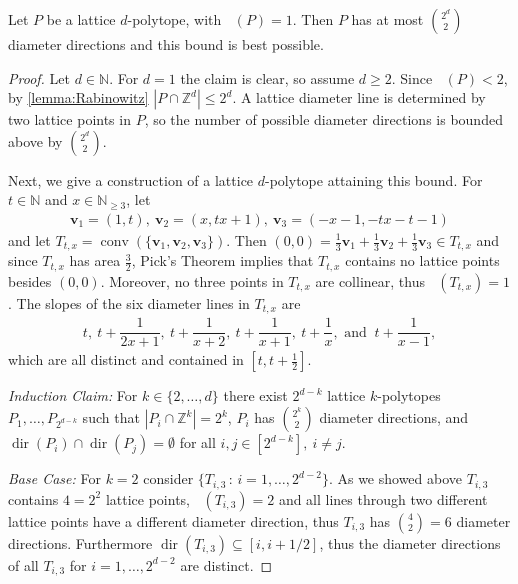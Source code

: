 \documentclass[11pt]{article}
\newcommand{\bv}{\mathbf{v}}
\newcommand{\Z}{\mathbb{Z}}
\newcommand{\N}{\mathbb{N}}
\DeclareMathOperator{\conv}{conv}
\DeclareMathOperator{\dir}{dir}
\DeclareMathOperator{\ldiam}{diam_\Z}
\newcommand{\st}{\, \mathrm{:}\,}
\begin{document}
\begin{theorem}\label{thm:diam-dir}
    Let $P$ be a lattice $d$-polytope, with $\ldiam(P)=1$. Then $P$ has at most $\binom{2^d}{2}$ diameter directions and this bound is best possible.
\end{theorem}

\begin{proof}
Let $d \in \N$. For $d=1$ the claim is clear, so assume $d \geq 2$. Since $\ldiam(P)<2$, by \ref{lemma:Rabinowitz} $|P \cap \Z^d| \leq 2^d$. A lattice diameter line is determined by two lattice points in $P$, so the number of possible diameter directions is bounded above by $\binom{2^d}{2}$.

Next, we give a construction of a lattice $d$-polytope attaining this bound. For $t \in \N$ and $x \in \N_{\geq 3}$, let\vspace{-5pt}
    \begin{align*}
        \bv_1=(1,t), \ \bv_2=(x, tx+1), \ \bv_3=(-x-1, -tx-t-1)
    \end{align*}
    and let $T_{t,x} = \conv (\{\bv_1,\bv_2,\bv_3\})$.
    Then $(0,0) = \frac{1}{3}\bv_1+ \frac{1}{3}\bv_2+ \frac{1}{3}\bv_3 \in T_{t,x}$ and since  $T_{t,x}$ has area $\frac{3}{2}$, Pick's Theorem \cite{pick99} implies that $T_{t,x}$ contains no lattice points besides $(0,0)$. Moreover, no three points in $T_{t,x}$ are collinear, thus $\ldiam(T_{t,x})=1$. The slopes of the six diameter lines in $T_{t,x}$ are
    \begin{align*}
    t, \ t + \dfrac{1}{2x + 1}, \ t + \dfrac{1}{x + 2}, \ t + \dfrac{1}{x + 1}, \ t + \dfrac{1}{x}, \text{ and }\ t + \dfrac{1}{x - 1},
    \end{align*}
    which are all distinct and contained in $[t,t+\frac{1}{2}]$.

    \emph{Induction Claim:} For $k \in \{2, \ldots, d\}$ there exist $2^{d-k}$ lattice $k$-polytopes $P_1, \ldots, P_{2^{d-k}}$ such that $|P_i \cap \Z^k| = 2^k$, $P_i$ has $\binom{2^k}{2}$ diameter directions, and $\dir(P_i) \cap \dir(P_j)  = \emptyset$ for all $i,j \in [2^{d-k}], \ i \neq j$.
    
    \emph{Base Case:} For $k=2$ consider $\{ T_{i,3} \st i=1, \ldots, 2^{d-2} \}$. As we showed above $T_{i,3}$ contains $4=2^2$ lattice points, $\ldiam(T_{i,3})=2$ and all lines through two different lattice points have a different diameter direction, thus $T_{i,3}$ has $\binom{4}{2}=6$ diameter directions. Furthermore $\dir(T_{i,3}) \subseteq [i,i+1/2]$, thus the diameter directions of all $T_{i,3}$ for $i =1, \ldots, 2^{d-2}$  are distinct. 


\end{proof}
\end{document}
